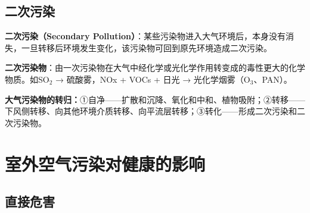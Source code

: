 \subsection{二次污染}

\begin{defbox}
\textbf{二次污染（Secondary Pollution）}：某些污染物进入大气环境后，本身没有消失，一旦转移后环境发生变化，该污染物可回到原先环境造成二次污染。

\textbf{二次污染物}：由一次污染物在大气中经化学或光化学作用转变成的毒性更大的化学物质。如SO$_2$ → 硫酸雾，NOx + VOCs + 日光 → 光化学烟雾（O$_3$、PAN）。

\textbf{大气污染物的转归：}①自净——扩散和沉降、氧化和中和、植物吸附；②转移——下风侧转移、向其他环境介质转移、向平流层转移；③转化——形成二次污染和二次污染物。
\end{defbox}

\section{室外空气污染对健康的影响}

\subsection{直接危害}


